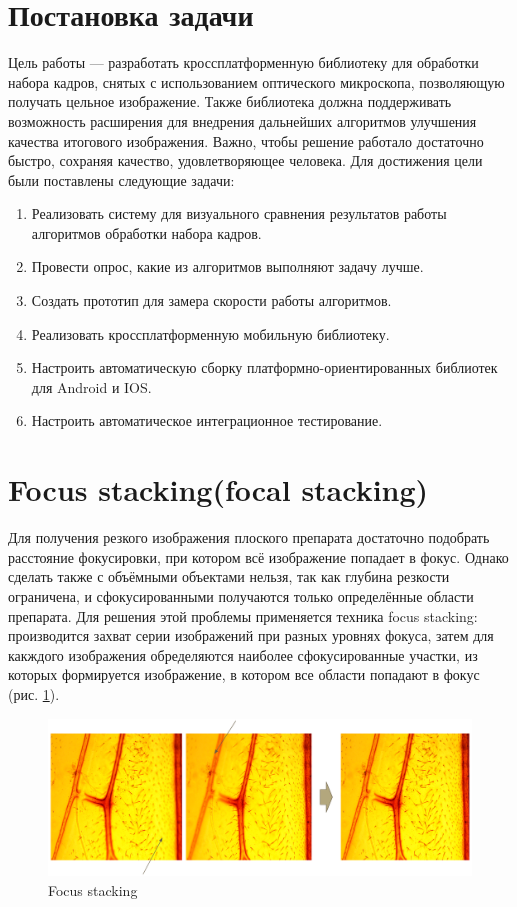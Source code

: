 \documentclass[14pt]{matmex-diploma-custom}
\begin{document}
\section{Постановка задачи}
Цель работы --- разработать кроссплатформенную библиотеку для обработки набора кадров, снятых с использованием оптического микроскопа, позволяющую получать цельное изображение. Также библиотека должна поддерживать возможность расширения для внедрения дальнейших алгоритмов улучшения качества итогового изображения. Важно, чтобы решение работало достаточно быстро, сохраняя качество, удовлетворяющее человека. Для достижения цели были поставлены следующие задачи:
\begin{enumerate}
    \item Реализовать систему для визуального сравнения результатов работы алгоритмов обработки набора кадров. 
    \item Провести опрос, какие из алгоритмов выполняют задачу лучше.
    \item Создать прототип для замера скорости работы алгоритмов.
    \item Реализовать кроссплатформенную мобильную библиотеку.
    \item Настроить автоматическую сборку платформно-ориентированных библиотек для Android и IOS.
    \item Настроить автоматическое интеграционное тестирование.
\end{enumerate}


\section{Focus stacking(focal stacking)}
Для получения резкого изображения плоского препарата достаточно подобрать расстояние фокусировки, при котором всё изображение попадает в фокус. Однако сделать также с объёмными объектами нельзя, так как глубина резкости ограничена, и сфокусированными получаются только определённые области препарата. Для решения этой проблемы применяется техника focus stacking: производится захват серии изображений при разных уровнях фокуса, затем для какждого изображения обределяются наиболее сфокусированные участки, из которых формируется изображение, в котором все области попадают в фокус (рис. \ref{focus_stacking1}).

\begin{figure}[h]
\label{focus_stacking1}
\centering
\includegraphics[width=1.0\textwidth]{figures/fs1.png}
\caption{Focus stacking}
\end{figure}
\end{document}
